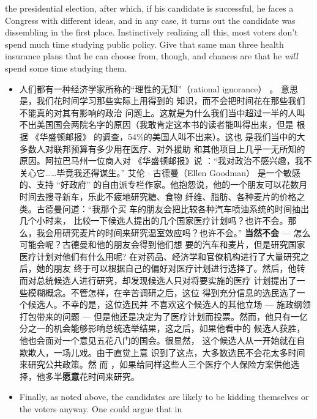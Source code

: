 \begin{paracol}{2}
\begin{itemize}
	the presidential election, after which, if his candidate is successful, he faces a Congress with different ideas, and in any case, it
	turns out the candidate was dissembling in the first place. Instinctively realizing all this, most voters don't spend much time
	studying public policy. Give that same man three health insurance plans that he can choose from, though, and chances are
	that he \textit{will} spend some time studying them.
\end{itemize}
\switchcolumn
\begin{itemize}
	\item 人们都有一种经济学家所称的“理性的无知”（ration­al ignorance） 。 意思是，我们花时间学习那些实际上用得到的
	知识，而不会把时间花在那些我们不能真的对其有影响的政治
	问题上。这就是为什么我们当中超过一半的人叫不出美国国会两院名字的原因（我敢肯定这本书的读者能叫得出来，但是
	根 据 《华盛顿邮报》 的调查，54\%的美国人叫不出来）。这也
	是我们当中的大多数人对联邦预算有多少用在医疗、对外援助
	和其他项目上几乎一无所知的原因。阿拉巴马州一位商人对
	《华盛顿邮报》说 ：“我对政治不感兴趣，我不关心它……毕竟我还得谋生。” 艾伦 $\cdot$ 古德曼（Ellen Goodman） 是一个敏感
	的、支持 “好政府” 的自由派专栏作家。他抱怨说，他的一个朋友可以花数月时间去搜寻新车，乐此不疲地研究糖、食物
	纤维、脂肪、各种麦片的价格之类。古德曼问道：“我那个买
	车的朋友会把比较各种汽车喷油系统的时间抽出几个小时来，
	比较一下候选人提出的几个国家医疗计划吗？也许不会。那
	么，我会用研究麦片的时间来研究温室效应吗？也许不会。”
	\textbf{当然不会} --- 怎么可能会呢？古德曼和他的朋友会得到他们想
	要的汽车和麦片，但是研究国家医疗计划对他们有什么用呢?
	在对药品、经济学和官僚机构进行了大量研究之后，她的朋友
	终于可以根据自己的偏好对医疗计划进行选择了。然后，他转
	而对总统候选人进行研究，却发现候选人只对将要实施的医疗
	计划提出了一些模糊概念。不管怎样，在辛苦调研之后，这位
	得到充分信息的选民选了一个候选人。不幸的是，这位选民并
	不喜欢这个候选人的其他立场 --- 施政纲领打包带来的问题
	--- 但是他还是决定为了医疗计划而投票。然而，他只有一亿
	分之一的机会能够影响总统选举结果，这之后，如果他看中的
	候选人获胜，他也会面对一个意见五花八门的国会。很显然，
	这个候选人从一开始就在自欺欺人，一场儿戏。由于直觉上意
	识到了这点，大多数选民不会花太多时间来研究公共政策。然
	而 ，如果给同样这些人三个医疗个人保险方案供他选择，他多半\textbf{愿意}花时间来研究。
\end{itemize}
\switchcolumn*
\begin{itemize}
	\item Finally, as noted above, the candidates are likely to be kidding themselves or the voters anyway. One could argue that in

\end{itemize}
\end{paracol}
